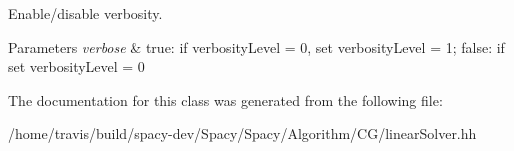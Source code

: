 Enable/disable verbosity. 


\begin{DoxyParams}{Parameters}
{\em verbose} & true\-: if verbosity\-Level = 0, set verbosity\-Level = 1; false\-: if set verbosity\-Level = 0 \\
\hline
\end{DoxyParams}


The documentation for this class was generated from the following file\-:\begin{DoxyCompactItemize}
\item 
/home/travis/build/spacy-\/dev/\-Spacy/\-Spacy/\-Algorithm/\-C\-G/linear\-Solver.\-hh\end{DoxyCompactItemize}
